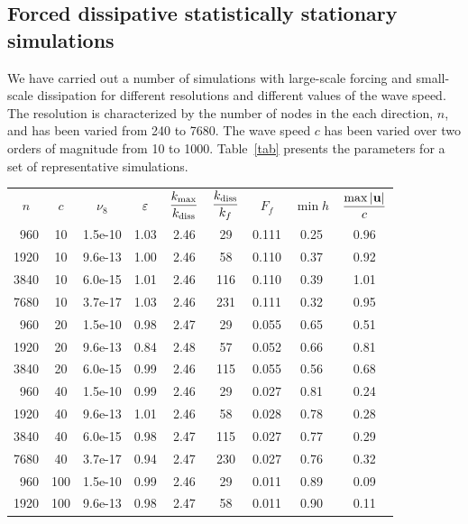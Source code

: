 \subsection{Forced dissipative statistically stationary simulations}

We have carried out a number of simulations 
with large-scale forcing and small-scale dissipation
for different resolutions and different values of the wave speed.
%
The resolution is characterized by the number of nodes in the each
direction, $n$, and has been varied from 240 to 7680.
%
The wave speed $c$ has been varied over two orders of magnitude from
10 to 1000.
%
Table~\ref{tab} presents the parameters for a set of representative
simulations.

\begin{table}
  \begin{center}
\begin{tabular}{cc@{\hskip 8mm}c@{\hskip 8mm}cccc@{\hskip 8mm}cc}
$n$ & $c$ & $\nu_8$ & $\varepsilon$ & $\displaystyle\frac{\kmax}{\kdiss}$ & $\displaystyle\frac{\kdiss}{k_f}$ & $F_f$ & $\min h$ & $\displaystyle\frac{\max |\textbf{u}|}{c}$ \\[3mm]
~960 &   10 & 1.5e-10 & 1.03 & 2.46 &  29 &  0.111 & 0.25 & 0.96 \\
1920 &   10 & 9.6e-13 & 1.00 & 2.46 &  58 &  0.110 & 0.37 & 0.92 \\
3840 &   10 & 6.0e-15 & 1.01 & 2.46 & 116 &  0.110 & 0.39 & 1.01 \\
7680 &   10 & 3.7e-17 & 1.03 & 2.46 & 231 &  0.111 & 0.32 & 0.95 \\[1mm]
~960 &   20 & 1.5e-10 & 0.98 & 2.47 &  29 &  0.055 & 0.65 & 0.51 \\
1920 &   20 & 9.6e-13 & 0.84 & 2.48 &  57 &  0.052 & 0.66 & 0.81 \\
3840 &   20 & 6.0e-15 & 0.99 & 2.46 & 115 &  0.055 & 0.56 & 0.68 \\[1mm]
~960 &   40 & 1.5e-10 & 0.99 & 2.46 &  29 &  0.027 & 0.81 & 0.24 \\
1920 &   40 & 9.6e-13 & 1.01 & 2.46 &  58 &  0.028 & 0.78 & 0.28 \\
3840 &   40 & 6.0e-15 & 0.98 & 2.47 & 115 &  0.027 & 0.77 & 0.29 \\
7680 &   40 & 3.7e-17 & 0.94 & 2.47 & 230 &  0.027 & 0.76 & 0.32 \\[1mm]
~960 &  100 & 1.5e-10 & 0.99 & 2.46 &  29 &  0.011 & 0.89 & 0.09 \\
1920 &  100 & 9.6e-13 & 0.98 & 2.47 &  58 &  0.011 & 0.90 & 0.11 \\

\end{tabular}
\end{center}
\end{table}
